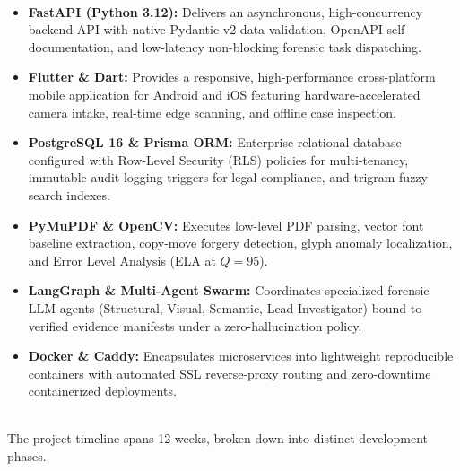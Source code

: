 \documentclass[12pt,a4paper]{article}
\begin{document}
\\[8pt]
\begin{itemize}
    \setlength\itemsep{3pt}
    \item \textbf{FastAPI (Python 3.12):} Delivers an asynchronous, high-concurrency backend API with native Pydantic v2 data validation, OpenAPI self-documentation, and low-latency non-blocking forensic task dispatching.
    \item \textbf{Flutter \& Dart:} Provides a responsive, high-performance cross-platform mobile application for Android and iOS featuring hardware-accelerated camera intake, real-time edge scanning, and offline case inspection.
    \item \textbf{PostgreSQL 16 \& Prisma ORM:} Enterprise relational database configured with Row-Level Security (RLS) policies for multi-tenancy, immutable audit logging triggers for legal compliance, and trigram fuzzy search indexes.
    \item \textbf{PyMuPDF \& OpenCV:} Executes low-level PDF parsing, vector font baseline extraction, copy-move forgery detection, glyph anomaly localization, and Error Level Analysis (ELA at $Q=95$).
    \item \textbf{LangGraph \& Multi-Agent Swarm:} Coordinates specialized forensic LLM agents (Structural, Visual, Semantic, Lead Investigator) bound to verified evidence manifests under a zero-hallucination policy.
    \item \textbf{Docker \& Caddy:} Encapsulates microservices into lightweight reproducible containers with automated SSL reverse-proxy routing and zero-downtime containerized deployments.
\end{itemize}

\newpage
{}\\[6pt]
\noindent The project timeline spans 12 weeks, broken down into distinct development phases.\\[8pt]
\end{document}
